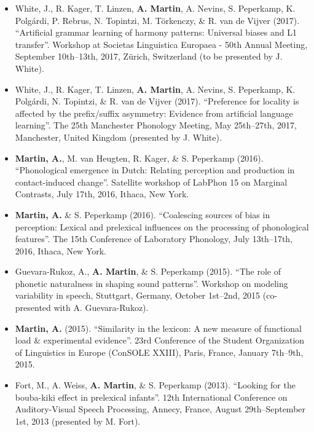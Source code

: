 \documentclass[a4paper, 10pt]{article}
\begin{document}
\begin{itemize}
\RaggedRight

\item  White, J., R. Kager, T. Linzen, \textbf{A. Martin}, A. Nevins,
  S. Peperkamp, K. Polgárdi, P. Rebrus, N. Topintzi, M. Törkenczy, \&
  R. van de Vijver (2017). \enquote{Artificial grammar learning of
    harmony patterns: Universal biases and L1 transfer}. Workshop at
  Societas Linguistica Europaea - 50th Annual Meeting, September
  10th--13th, 2017, Zürich, Switzerland (to be presented by J. White).

\item White, J., R. Kager, T. Linzen, \textbf{A. Martin}, A. Nevins,
  S. Peperkamp, K. Polgárdi, N. Topintzi, \&  R. van de Vijver
  (2017). \enquote{Preference for locality is affected by the
    prefix/suffix asymmetry: Evidence from artificial language
    learning}.  The 25th Manchester Phonology Meeting, May 25th--27th,
  2017, Manchester, United Kingdom (presented by J. White).

\item \textbf{Martin, A.}, M. van Heugten, R. Kager, \& S. Peperkamp
  (2016). \enquote{Phonological emergence in Dutch: Relating
    perception and production in contact-induced change}. Satellite
  workshop of LabPhon 15 on Marginal Contrasts, July 17th, 2016,
  Ithaca, New York.

\item \textbf{Martin, A.} \& S. Peperkamp (2016).  \enquote{Coalescing sources of bias in perception:
    Lexical and prelexical influences on the processing of phonological
    features}. The 15th Conference of
  Laboratory Phonology, July 13th--17th, 2016, Ithaca, New York.

\item Guevara-Rukoz, A., \textbf{A. Martin}, \& S. Peperkamp
  (2015). \enquote{The role of phonetic naturalness in shaping sound
    patterns}. Workshop on modeling variability in speech, Stuttgart,
  Germany, October 1st--2nd, 2015 (co-presented with
  A. Guevara-Rukoz).

\item \textbf{Martin, A.} (2015). \enquote{Similarity in the lexicon: A new measure of functional load \& experimental evidence}.  23rd
  Conference of the Student Organization of Linguistics in Europe
  (ConSOLE XXIII), Paris, France, January 7th--9th, 2015.

\item Fort, M., A. Weiss, \textbf{A. Martin}, \& S. Peperkamp (2013). \enquote{Looking
  for the bouba-kiki effect in prelexical infants}. 12th International
  Conference on Auditory-Visual Speech Processing, Annecy, France,
  August 29th--September 1st, 2013 (presented by M. Fort).

\end{itemize}
\end{document}
